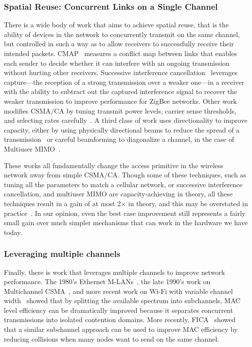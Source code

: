 \subsubsection{Spatial Reuse: Concurrent Links on a Single Channel}
There is a wide body of work that aims to achieve spatial reuse, that is the ability of devices in the network to concurrently transmit on the same channel, but controlled in such a way as to allow receivers to successfully receive their intended packets. CMAP~\cite{vutukuru_cmap} measures a conflict map between links that enables each sender to decide whether it can interfere with an ongoing transmission without hurting other receivers. Successive interference cancellation~\cite{halperin_sic} leverages capture---the reception of a strong transmission over a weaker one---in a receiver with the ability to subtract out the captured interference signal to recover the weaker transmission to improve performance for ZigBee networks. Other work modifies CSMA/CA by tuning transmit power levels, carrier sense thresholds, and selecting rates carefully~\cite{kim_tuning}. A third class of work uses directionality to improve capacity, either by using physically directional beams to reduce the spread of a transmission~\cite{liu_dirc} or careful beamforming to diagonalize a channel, in the case of Multiuser MIMO~\cite{heath_mumimo,spencer_mumimo}.

These works all fundamentally change the access primitive in the wireless network away from simple CSMA/CA. Though some of these techniques, such as tuning all the parameters to match a cellular network, or successive interference cancellation, and multiuser MIMO are capacity-achieving in theory, all these techniques result in a gain of at most 2$\times$ in theory, and this may be overstated in practice~\cite{brodsky_csma}. In our opinion, even the best case improvement still represents a fairly small gain over much simpler mechanisms that can work in the hardware we have today. 

\subsubsection{Leveraging multiple channels}
Finally, there is work that leverages multiple channels to improve network performance. The 1980's Ethernet M-LANs~\cite{marsan_multichan}, the late 1990's work on Multichannel CSMA~\cite{nasipuri_multichan}, and more recent work on Wi-Fi with variable channel width~\cite{chandra_chanwidth} showed that by splitting the available spectrum into subchannels, MAC level efficiency can be dramatically improved because it separates concurrent transmissions into isolated contention domains. More recently, FICA~\cite{tan_fica} showed that a similar subchannel approach can be used to improve MAC efficiency by reducing collisions when many nodes want to send on the same channel.

